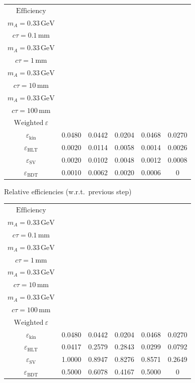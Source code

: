 \documentclass[10pt,a4paper]{article}
\begin{document}
{\begin{tabular}{cccccc}
\toprule
$\mathrm{Efficiency}$ & \shortstack{$m_{\pi}=1\,\mathrm{GeV}$\\$m_{A}=0.33\,\mathrm{GeV}$\\$c\tau=0.1\,\mathrm{mm}$} & \shortstack{$m_{\pi}=1\,\mathrm{GeV}$\\$m_{A}=0.33\,\mathrm{GeV}$\\$c\tau=1\,\mathrm{mm}$} & \shortstack{$m_{\pi}=1\,\mathrm{GeV}$\\$m_{A}=0.33\,\mathrm{GeV}$\\$c\tau=10\,\mathrm{mm}$} & \shortstack{$m_{\pi}=1\,\mathrm{GeV}$\\$m_{A}=0.33\,\mathrm{GeV}$\\$c\tau=100\,\mathrm{mm}$} & \shortstack{$\mathrm{QCD}$\\$\mathrm{Weighted}\ \varepsilon$} \\
\midrule
$\varepsilon_{\mathrm{kin}}$ & 0.0480 & 0.0442 & 0.0204 & 0.0468 & 0.0270\\
$\varepsilon_{\mathrm{HLT}}$ & 0.0020 & 0.0114 & 0.0058 & 0.0014 & 0.0026\\
$\varepsilon_{\mathrm{SV}}$ & 0.0020 & 0.0102 & 0.0048 & 0.0012 & 0.0008\\
$\varepsilon_{\mathrm{BDT}}$ & 0.0010 & 0.0062 & 0.0020 & 0.0006 & $0$\\
\bottomrule
\end{tabular}

\vspace{18pt}

Relative efficiencies (w.r.t.\ previous step)

\begin{tabular}{cccccc}
\toprule
$\mathrm{Efficiency}$ & \shortstack{$m_{\pi}=1\,\mathrm{GeV}$\\$m_{A}=0.33\,\mathrm{GeV}$\\$c\tau=0.1\,\mathrm{mm}$} & \shortstack{$m_{\pi}=1\,\mathrm{GeV}$\\$m_{A}=0.33\,\mathrm{GeV}$\\$c\tau=1\,\mathrm{mm}$} & \shortstack{$m_{\pi}=1\,\mathrm{GeV}$\\$m_{A}=0.33\,\mathrm{GeV}$\\$c\tau=10\,\mathrm{mm}$} & \shortstack{$m_{\pi}=1\,\mathrm{GeV}$\\$m_{A}=0.33\,\mathrm{GeV}$\\$c\tau=100\,\mathrm{mm}$} & \shortstack{$\mathrm{QCD}$\\$\mathrm{Weighted}\ \varepsilon$} \\
\midrule
$\varepsilon_{\mathrm{kin}}$ & 0.0480 & 0.0442 & 0.0204 & 0.0468 & 0.0270\\
$\varepsilon_{\mathrm{HLT}}$ & 0.0417 & 0.2579 & 0.2843 & 0.0299 & 0.0792\\
$\varepsilon_{\mathrm{SV}}$ & 1.0000 & 0.8947 & 0.8276 & 0.8571 & 0.2649\\
$\varepsilon_{\mathrm{BDT}}$ & 0.5000 & 0.6078 & 0.4167 & 0.5000 & $0$\\
\bottomrule
\end{tabular}

}
\end{document}
